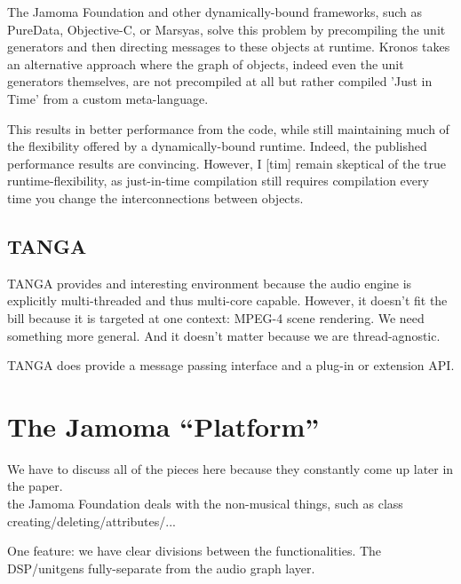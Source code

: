 \documentclass[twoside,10pt]{article}
\begin{document}
The Jamoma Foundation and other dynamically-bound frameworks, such as PureData, Objective-C, or Marsyas, solve this problem by precompiling the unit generators and then directing messages to these objects at runtime.  Kronos takes an alternative approach where the graph of objects, indeed even the unit generators themselves, are not precompiled at all but rather compiled 'Just in Time' from a custom meta-language. 

This results in better performance from the code, while still maintaining much of the flexibility offered by a dynamically-bound runtime.  Indeed, the published performance results are convincing.  However, I [tim] remain skeptical of the true runtime-flexibility, as just-in-time compilation still requires compilation every time you change the interconnections between objects.


\subsection{TANGA} %

TANGA provides and interesting environment because the audio engine is explicitly multi-threaded and thus multi-core capable\cite{Reiter:2007}.  However, it doesn't fit the bill because it is targeted at one context: MPEG-4 scene rendering.  We need something more general.  And it doesn't matter because we are thread-agnostic.

TANGA does provide a message passing interface and a plug-in or extension API.



\section{The Jamoma ``Platform''} %

We have to discuss all of the pieces here because they constantly come up later in the paper.\\

the Jamoma Foundation deals with the non-musical things, such as class creating/deleting/attributes/...

One feature: we have clear divisions between the functionalities.   The DSP/unitgens fully-separate from the audio graph layer.
\end{document}
